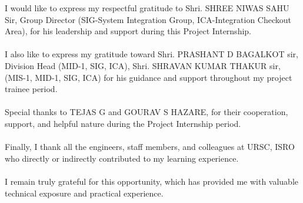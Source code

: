 \documentclass[11pt,a4paper,oneside]{report}
\begin{document}
I would like to express my respectful gratitude to Shri. SHREE NIWAS SAHU Sir, Group Director (SIG-System Integration Group, ICA-Integration Checkout Area), for his leadership and support during this Project Internship.\\
\\
I also like to express my gratitude toward Shri. PRASHANT D BAGALKOT sir, Division Head (MID-1, SIG, ICA), Shri. SHRAVAN KUMAR THAKUR sir, (MIS-1, MID-1, SIG, ICA) for his guidance and support throughout my project trainee period.\\
\\
Special thanks to TEJAS G and GOURAV S HAZARE, for their cooperation, support, and helpful nature during the Project Internship period.\\
\\
Finally, I thank all the engineers, staff members, and colleagues at URSC, ISRO who directly or indirectly contributed to my learning experience.\\
\\
I remain truly grateful for this opportunity, which has provided me with valuable technical exposure and practical experience.
\end{document}
